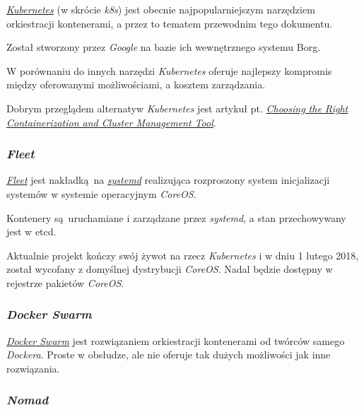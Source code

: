 \documentclass[a4paper,12pt,twoside,openany]{report}
\begin{document}
\href{https://kubernetes.io/}{\emph{Kubernetes}} (w skrócie \emph{k8s})
jest obecnie najpopularniejszym narzędziem orkiestracji kontenerami, a
przez to tematem przewodnim tego dokumentu.

Został stworzony przez \emph{Google} na bazie ich wewnętrznego systemu
Borg.

W porównaniu do innych narzędzi \emph{Kubernetes} oferuje najlepszy
kompromis między oferowanymi możliwościami, a kosztem zarządzania.

Dobrym przeglądem alternatyw \emph{Kubernetes} jest artykuł pt.
\href{https://dzone.com/articles/choosing-the-right-containerization-and-cluster-management-tool}{\emph{Choosing
the Right Containerization and Cluster Management Tool}}.

\hypertarget{fleet}{%
\subsubsection{\texorpdfstring{\emph{Fleet}}{Fleet}}\label{fleet}}

\href{https://github.com/coreos/fleet}{\emph{Fleet}} jest nakładką~na
\href{https://www.freedesktop.org/wiki/Software/systemd/}{\emph{systemd}}
realizująca rozproszony system inicjalizacji systemów w systemie
operacyjnym \emph{CoreOS}.

Kontenery są~uruchamiane i zarządzane przez \emph{systemd}, a stan
przechowywany jest w etcd.

Aktualnie projekt kończy swój żywot na rzecz \emph{Kubernetes} i w dniu
1 lutego 2018, został wycofany z domyślnej dystrybucji \emph{CoreOS}.
Nadal będzie dostępny w rejestrze pakietów \emph{CoreOS}.

\hypertarget{docker-swarm}{%
\subsubsection{\texorpdfstring{\emph{Docker
Swarm}}{Docker Swarm}}\label{docker-swarm}}

\href{https://docs.docker.com/engine/swarm/}{\emph{Docker Swarm}} jest
rozwiązaniem orkiestracji kontenerami od twórców samego \emph{Dockera}.
Proste w obsłudze, ale nie oferuje tak dużych możliwości jak inne
rozwiązania.

\hypertarget{nomad}{%
\subsubsection{\texorpdfstring{\emph{Nomad}}{Nomad}}\label{nomad}}
\end{document}
